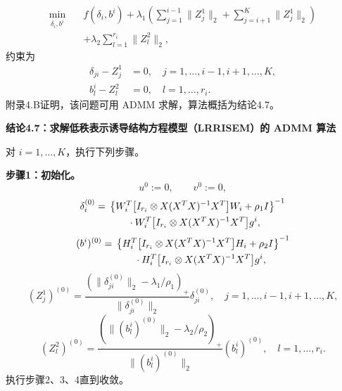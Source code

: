 \begin{equation}
\begin{aligned}
\min_{\delta_i,b^i}\quad&f(\delta_i,b^i)
+\lambda_1\left(\sum_{j=1}^{i-1}\lVert Z_j^1\rVert_2
+\sum_{j=i+1}^{K}\lVert Z_j^1\rVert_2\right)\\
&+\lambda_2\sum_{l=1}^{r_i}\lVert Z_l^2\rVert_2,
\end{aligned}
\tag{4.171}
\end{equation}
约束为
\[
\begin{aligned}
\delta_{ji}-Z_j^1&=0,\quad j=1,\ldots,i-1,i+1,\ldots,K,\\
b_l^i-Z_l^2&=0,\quad l=1,\ldots,r_i.
\end{aligned}
\]
附录4.B证明，该问题可用 ADMM 求解，算法概括为结论4.7。

\par\medskip{}
\noindent\textbf{结论4.7：求解低秩表示诱导结构方程模型（LRRISEM）的 ADMM 算法}\par
对 $i=1,\ldots,K$，执行下列步骤。

\noindent\textbf{步骤1：初始化。}
\[
u^0:=0,\qquad v^0:=0,
\]
\[
\begin{aligned}
\delta_i^{(0)}={}&\left\{W_i^T\bigl[I_{r_i}\otimes X(X^TX)^{-1}X^T\bigr] W_i+\rho_1I\right\}^{-1}\\
&\qquad\cdot W_i^T\bigl[I_{r_i}\otimes X(X^TX)^{-1}X^T\bigr] g^i,
\end{aligned}
\]
\[
\begin{aligned}
(b^i)^{(0)}={}&\left\{H_i^T\bigl[I_{r_i}\otimes X(X^TX)^{-1}X^T\bigr] H_i+\rho_2I\right\}^{-1}\\
&\qquad\cdot H_i^T\bigl[I_{r_i}\otimes X(X^TX)^{-1}X^T\bigr] g^i,
\end{aligned}
\]
\[
(Z_j^1)^{(0)}=\frac{(\lVert\delta_{ji}^{(0)}\rVert_2-\lambda_1/\rho_1)_+}{\lVert\delta_{ji}^{(0)}\rVert_2}\delta_{ji}^{(0)},
\quad j=1,\ldots,i-1,i+1,\ldots,K,
\]
\[
(Z_l^2)^{(0)}=\frac{(\lVert(b_l^i)^{(0)}\rVert_2-\lambda_2/\rho_2)_+}{\lVert(b_l^i)^{(0)}\rVert_2}(b_l^i)^{(0)},
\quad l=1,\ldots,r_i.
\]
执行步骤2、3、4直到收敛。

